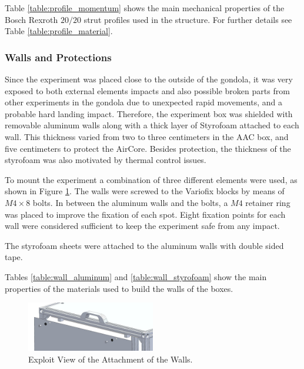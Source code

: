 \bigskip
Table \ref{table:profile_momentum} shows the main mechanical properties of the Bosch Rexroth $20/20$ strut profiles used in the structure. For further details see Table \ref{table:profile_material}.



\smallskip

\subsubsection{Walls and Protections}
\label{sec:4.4.2}

Since the experiment was placed close to the outside of the gondola, it was very exposed to both external elements impacts and also possible broken parts from other experiments in the gondola due to unexpected rapid movements, and a probable hard landing impact. Therefore, the experiment box was shielded with removable aluminum walls along with a thick layer of Styrofoam attached to each wall. This thickness varied from two to three centimeters in the AAC box, and five centimeters to protect the AirCore. Besides protection, the thickness of the styrofoam was also motivated by thermal control issues.

To mount the experiment a combination of three different elements were used, as shown in Figure \ref{fig:wall_attach}. The walls were screwed to the Variofix blocks by means of $M4\times8$ bolts. In between the aluminum walls and the bolts, a $M4$ retainer ring was placed to improve the fixation of each spot. Eight fixation points for each wall were considered sufficient to keep the experiment safe from any impact.

The styrofoam sheets were attached to the aluminum walls with double sided tape.

Tables \ref{table:wall_aluminum} and \ref{table:wall_styrofoam} show the main properties of the materials used to build the walls of the boxes.

 \begin{figure}[H]
     \centering
     \includegraphics[width=0.5\textwidth]{4-experiment-design/img/Mechanical/wall_attachment.jpg}
     \caption{Exploit View of the Attachment of the Walls.}
     \label{fig:wall_attach}
\end{figure}

